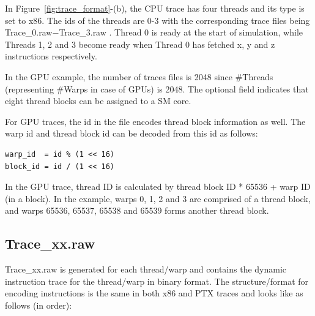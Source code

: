 In Figure~\ref{fig:trace_format}-(b), the CPU trace has four threads and its
type is set to x86. The ids of the threads are 0-3 with the corresponding trace
files being Trace\_0.raw$-$Trace\_3.raw . Thread 0 is ready at the start of
simulation, while Threads 1, 2 and 3 become ready when Thread 0 has fetched x,
y and z instructions respectively.


In the GPU example, the number of traces files is 2048 since \#Threads
(representing \#Warps in case of GPUs) is 2048.  The optional field indicates
that eight thread blocks can be assigned to a SM core. 

For GPU traces, the id in the file encodes thread block information as
well. The warp id and thread block id can be decoded from this id as follows:

\begin{Verbatim}
warp_id  = id % (1 << 16)
block_id = id / (1 << 16)
\end{Verbatim}

\ignore
		{
		In the GPU trace, thread ID is calculated by thread block ID * 65536 + warp ID (in a block). 
		In the example, warps 0, 1, 2 and 3 are comprised of a thread block, and warps 65536, 65537, 65538
		and 65539 forms another thread block.
		}

\subsection{Trace\_xx.raw}

Trace\_xx.raw is generated for each thread/warp and contains the
dynamic instruction trace for the thread/warp in binary
format. The structure/format for encoding instructions is the same in
both x86 and PTX traces and looks like as follows (in order):




